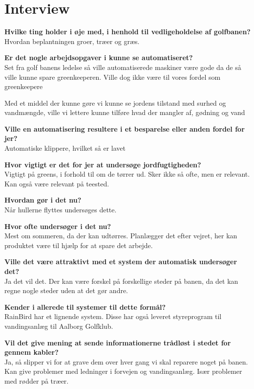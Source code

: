 \chapter{Interview}
\textbf{Hvilke ting holder i øje med, i henhold til vedligeholdelse af golfbanen?}\\
Hvordan beplantningen groer, træer og græs.

\textbf{Er det nogle arbejdsopgaver i kunne se automatiseret?}\\
Set fra golf banens ledelse så ville automatiserede maskiner være gode da de så ville kunne spare greenkeeperen.
Ville dog ikke være til vores fordel som greenkeepere

Med et middel der kunne gøre vi kunne se jordens tilstand med surhed og vandmængde, ville vi lettere kunne tilføre hvad der mangler af, gødning og vand

\textbf{Ville en automatisering resultere i et besparelse eller anden fordel for jer?}\\
Automatiske klippere, hvilket så er lavet 


\textbf{Hvor vigtigt er det for jer at undersøge jordfugtigheden?}\\
Vigtigt på greens, i forhold til om de tørrer ud. Sker ikke så ofte, men er relevant.
Kan også være relevant på teested.

\textbf{Hvordan gør i det nu?}\\
Når hullerne flyttes undersøges dette.

\textbf{Hvor ofte undersøger i det nu?}\\
Mest om sommeren, da der kan udtørres. Planlægger det efter vejret, her kan produktet være til hjælp for at spare det arbejde.

\textbf{Ville det være attraktivt med et system der automatisk undersøger det?}\\
Ja det vil det. Der kan være forskel på forskellige steder på banen, da det kan regne nogle steder uden at det gør andre.

\textbf{Kender i allerede til systemer til dette formål?}\\
RainBird har et lignende system. Disse har også leveret styreprogram til vandingsanlæg til Aalborg Golfklub.

\textbf{Vil det give mening at sende informationerne trådløst i stedet for gennem kabler?}\\
Ja, så slipper vi for at grave dem over hver gang vi skal reparere noget på banen. Kan give problemer med ledninger i forvejen og vandingsanlæg. Især problemer med rødder på træer.

